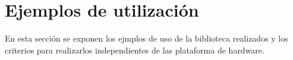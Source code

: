 \section{Ejemplos de utilización}
\label{sec:libExamples}

En esta sección se exponen los ejmplos de uso de la biblioteca realizados y los
criterios para realizarlos independientes de las plataforma de hardware.
